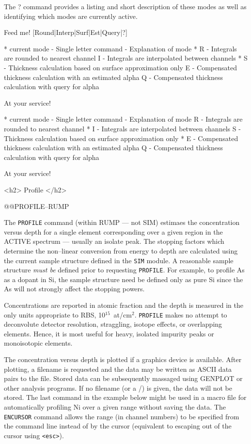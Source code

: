 {{{{{The ? command provides a listing and short description of these modes as well
as identifying which modes are currently active. 

\medskip\beginscreen
Feed me! 
[Round|Interp|Surf|Est|Query|?] 

* current mode - Single letter command - Explanation of mode
* R - Integrals are rounded to nearest channel
  I - Integrals are interpolated between channels
* S - Thickness calculation based on surface approximation only
  E - Compensated thickness calculation with an estimated alpha
  Q - Compensated thickness calculation with query for alpha

At your service! 

* current mode - Single letter command - Explanation of mode
  R - Integrals are rounded to nearest channel
* I - Integrals are interpolated between channels
  S - Thickness calculation based on surface approximation only
* E - Compensated thickness calculation with an estimated alpha
  Q - Compensated thickness calculation with query for alpha

At your service! 
\endscreen

<h2> Profile </h2>


@@{PROFILE--RUMP}

The {\tt PROFILE} command (within RUMP --- not SIM) estimaes the concentration
versus depth for a single element corresponding over a given region in the
ACTIVE spectrum --- usually an isolate peak.  The stopping factors which
determine the non--linear conversion from energy to depth are calculated using
the current sample structure defined in the {\tt SIM} module.  A reasonable
sample structure {\it must be} defined prior to requesting {\tt PROFILE}.  For
example, to profile As as a dopant in Si, the sample structure need be defined
only as pure Si since the As will not strongly affect the stopping powers.

Concentrations are reported in atomic fraction and the depth is measured in
the only units appropriate to RBS, 10$^{15}$~at/cm$^2$.  {\tt PROFILE} makes
no attempt to deconvolute detector resolution, straggling, isotope effects, or
overlapping elements.  Hence, it is most useful for heavy, isolated impurity
peaks or monoisotopic elements.

The concentration versus depth is plotted if a graphics device is available.
After plotting, a filename is requested and the data may be written as ASCII
data pairs to the file.  Stored data can be subsequently massaged using
GENPLOT or other analysis programs.  If no filename (or a /) is given, the
data will not be stored.  The last command in the example below
might be used in a macro file for automatically profiling Ni over a given
range without saving the data.  The {\tt ENCURSOR} command allows the range
(in channel numbers) to be specified from the command line instead of by the
cursor (equivalent to escaping out of the cursor using {\tt <esc>}).

}}}}}
